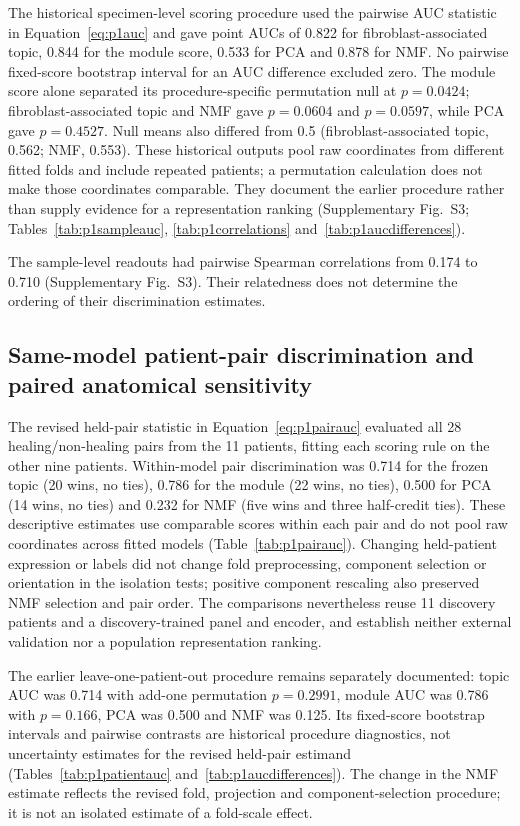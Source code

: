 \documentclass[10pt,a4paper]{article}
\begin{document}
The historical specimen-level scoring procedure used the pairwise AUC statistic in Equation~\eqref{eq:p1auc} and gave point AUCs of 0.822 for fibroblast-associated topic, 0.844 for the module score, 0.533 for PCA and 0.878 for NMF. No pairwise fixed-score bootstrap interval for an AUC difference excluded zero. The module score alone separated its procedure-specific permutation null at $p=0.0424$; fibroblast-associated topic and NMF gave $p=0.0604$ and $p=0.0597$, while PCA gave $p=0.4527$. Null means also differed from 0.5 (fibroblast-associated topic, 0.562; NMF, 0.553). These historical outputs pool raw coordinates from different fitted folds and include repeated patients; a permutation calculation does not make those coordinates comparable. They document the earlier procedure rather than supply evidence for a representation ranking (Supplementary Fig.~S3\label{call:p1f7}; Tables~\ref{tab:p1sampleauc}, \ref{tab:p1correlations} and~\ref{tab:p1aucdifferences}).

The sample-level readouts had pairwise Spearman correlations from 0.174 to 0.710 (Supplementary Fig.~S3). Their relatedness does not determine the ordering of their discrimination estimates.




\subsection{Same-model patient-pair discrimination and paired anatomical sensitivity}

The revised held-pair statistic in Equation~\eqref{eq:p1pairauc} evaluated all 28 healing/non-healing pairs from the 11 patients, fitting each scoring rule on the other nine patients. Within-model pair discrimination was 0.714 for the frozen topic (20 wins, no ties), 0.786 for the module (22 wins, no ties), 0.500 for PCA (14 wins, no ties) and 0.232 for NMF (five wins and three half-credit ties). These descriptive estimates use comparable scores within each pair and do not pool raw coordinates across fitted models (Table~\ref{tab:p1pairauc}). Changing held-patient expression or labels did not change fold preprocessing, component selection or orientation in the isolation tests; positive component rescaling also preserved NMF selection and pair order. The comparisons nevertheless reuse 11 discovery patients and a discovery-trained panel and encoder, and establish neither external validation nor a population representation ranking.

The earlier leave-one-patient-out procedure remains separately documented: topic AUC was 0.714 with add-one permutation $p=0.2991$, module AUC was 0.786 with $p=0.166$, PCA was 0.500 and NMF was 0.125. Its fixed-score bootstrap intervals and pairwise contrasts are historical procedure diagnostics, not uncertainty estimates for the revised held-pair estimand (Tables~\ref{tab:p1patientauc} and~\ref{tab:p1aucdifferences}). The change in the NMF estimate reflects the revised fold, projection and component-selection procedure; it is not an isolated estimate of a fold-scale effect.
\end{document}
